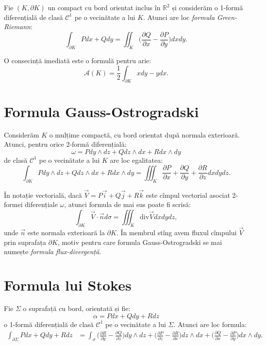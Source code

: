 \documentclass[11pt,a4paper]{article}
\newcommand\kal{\mathcal}
\newcommand\RR{\mathbb{R}}
\theoremstyle{dotless}
\theoremstyle{dotlessdr}
\begin{document}
Fie $(K, \partial K)$ un compact cu bord orientat inclus în $\RR^2$ și considerăm
o 1-formă diferențială de clasă $\kal{C}^1$ pe o vecinătate a lui $K$. Atunci
are loc \emph{formula Green-Riemann}:
\[
  \int_{\partial K} Pdx + Qdy = \iint_K \Big(\frac{\partial Q}{\partial x} - %
  \frac{\partial P}{\partial y} \Big) dx dy.
\]

O consecință imediată este o formulă pentru arie:
\[
  \mathcal{A}(K) = \frac{1}{2} \int_{\partial K} xdy - ydx.
\]


\section{Formula Gauss-Ostrogradski}
\label{sec:g-o}

Considerăm $K$ o mulțime compactă, cu bord orientat după normala exterioară. Atunci,
pentru orice 2-formă diferențială:
\[
  \omega = Pdy \wedge dz + Q dz \wedge dx + R dx \wedge dy
\]
de clasă $\kal{C}^1$ pe o vecinătate a lui $K$ are loc egalitatea:
\[
  \int_{\partial K} P dy \wedge dz + Q dz \wedge dx + R dx \wedge dy = %
  \iiint_K \frac{\partial P}{\partial x} + \frac{\partial Q}{\partial y} + %
  \frac{\partial R}{\partial z} dxdydz.
\]

În notație vectorială, dacă $\vec{V} = P \vec{i} + Q \vec{j} + R \vec{k}$ este
cîmpul vectorial asociat 2-formei diferențiale $\omega$, atunci formula de mai sus
poate fi scrisă:
\[
  \int_{\partial K} \vec{V} \cdot \vec{n} d \sigma = \iiint_K \mathrm{div}\vec{V} dxdydz,
\]
unde $\vec{n}$ este normala exterioară la $\partial K$. În membrul stîng avem
fluxul cîmpului $\vec{V}$ prin suprafața $\partial K$, motiv pentru care formula
Gauss-Ostrogradski se mai numește \emph{formula flux-divergență}.


\section{Formula lui Stokes}
\label{sec:stokes}

Fie $\Sigma$ o suprafață cu bord, orientată și fie:
\[
  \alpha = Pdx + Qdy + Rdz
\]
o 1-formă diferențială de clasă $\kal{C}^1$ pe o vecinătate a lui $\Sigma$.
Atunci are loc formula:
\begin{align*}
  \int_{\partial \Sigma} Pdx + Qdy + Rdz &= \int_\sigma \Big( \frac{\partial R}{\partial y} -
                                           \frac{\partial Q}{\partial z} \Big) dy \wedge dz +
                                           \Big( \frac{\partial P}{\partial z} -
                                           \frac{\partial R}{\partial x} \Big) dz \wedge dx +
                                           \Big( \frac{\partial Q}{\partial x} -
                                           \frac{\partial P}{\partial y}\Big) dx \wedge dy.
\end{align*}
\end{document}
